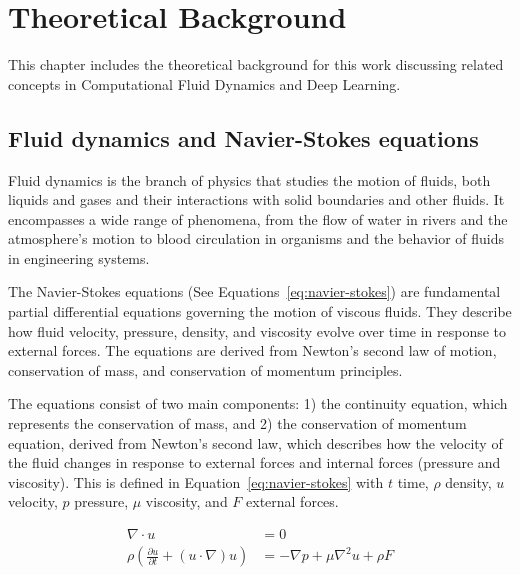 
\chapter {Theoretical Background}
\label{ch:TheoreticalBackground}

This chapter includes the theoretical background for this work discussing related concepts in Computational Fluid Dynamics and Deep Learning.

\section{Fluid dynamics and Navier-Stokes equations}
\label{sec:FluidDynamicsAndNavier-StokesEquations} 

Fluid dynamics is the branch of physics that studies the motion of fluids, both liquids and gases and their interactions with solid boundaries and other fluids. It encompasses a wide range of phenomena, from the flow of water in rivers and the atmosphere's motion to blood circulation in organisms and the behavior of fluids in engineering systems.

The Navier-Stokes equations (See Equations~\ref{eq:navier-stokes}) are fundamental partial differential equations governing the motion of viscous fluids. They describe how fluid velocity, pressure, density, and viscosity evolve over time in response to external forces. The equations are derived from Newton's second law of motion, conservation of mass, and conservation of momentum principles.

The equations consist of two main components: 1) the continuity equation, which represents the conservation of mass, and 2) the conservation of momentum equation, derived from Newton's second law, which describes how the velocity of the fluid changes in response to external forces and internal forces (pressure and viscosity). This is defined in Equation~\ref{eq:navier-stokes} with $t$ time, $\rho$ density, $u$ velocity, $p$ pressure, $\mu$ viscosity, and $F$ external forces.

\begin{equation}
    \begin{aligned}
        \nabla \cdot u &= 0 \\
        \rho(\frac{\partial u}{\partial t} + (u\cdot\nabla)u) &= -\nabla p + \mu \nabla^2 u + \rho F
    \end{aligned}
    \label{eq:navier-stokes}
\end{equation}

